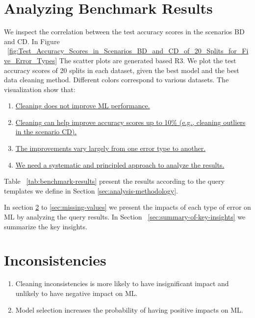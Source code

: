 \section{Analyzing Benchmark Results}
We inspect the correlation between the test accuracy scores in
the scenarios BD and CD. In Figure ~\ref{fig:Test_Accuracy_Scores_in_Scenarios_BD_and_CD_of_20_Splits_for_Five_Error_Types}
The scatter plots are generated based R3. We plot the test accuracy scores of 20 splits in each
dataset, given the best model and the best data cleaning method. Different colors correspond to various datasets. The visualization show that: 
\begin{enumerate}
	\item{
		\underline{Cleaning does not improve ML performance.}
	}
	\item {
		\underline{Cleaning can help improve accuracy scores up to 10\% (e.g., cleaning outliers in the scenario CD).}
	}
	\item {
		\underline{The improvements vary largely from one error type to another.}
	}
	\item {
		\underline{We need a systematic and principled approach to analyze the results.}
	}
\end{enumerate}

Table ~\ref{tab:benchmark-results} present the results according to the query templates we define in Section \ref{sec:analysis-methodology}.

In section \ref{sec:inconsistencies} to \ref{sec:missing-values} we present the impacts of each type of error on ML by analyzing the query results. 
In Section ~\ref{sec:summary-of-key-insights} we summarize the key insights. 

\section{Inconsistencies} \label{sec:inconsistencies}

\begin{enumerate}
	\item {
		Cleaning inconsistencies is more likely to have insignificant impact and unlikely to have negative impact on ML.
	}
	\item {
		Model selection increases the probability of having positive impacts on ML.
	}
\end{enumerate}

